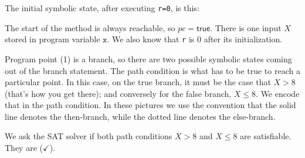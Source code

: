 \documentclass[11pt]{article}
\begin{document}
The initial symbolic state, after executing \texttt{r=0}, is this:
\begin{center}
\end{center}
The start of the method is always reachable, so \textbf{$pc = \textsf{true}$}. There is one input $X$
stored in program variable $\texttt{x}$. We also know that \texttt{r} is 0 after its initialization.

Program point (1) is a branch, so there are two possible symbolic states coming out of the branch statement.
The path condition is what has to be true to reach a particular point. In this case, on the true branch, it must be
the case that $X > 8$ (that's how you get there); and conversely for the false branch, $X \le 8$. We encode that in the
path condition. In these pictures we use the convention that the solid line denotes the then-branch, while the dotted line
denotes the else-branch.

\begin{center}
\end{center}
We ask the SAT solver if both path conditions $X > 8$ and $X \le 8$ are satisfiable. They are ($\checkmark$).
\end{document}
